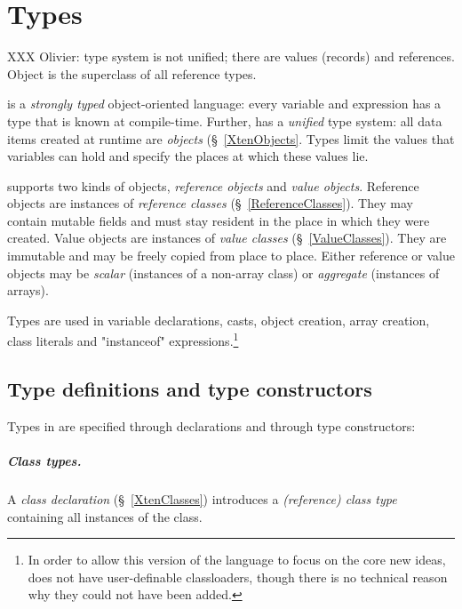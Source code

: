 \chapter{Types}
\label{XtenTypes}

XXX Olivier: type system is not unified; there are values
(records) and references.
Object is the superclass of all reference types.

{}\Xten{} is a {\em strongly typed} object-oriented language: every variable
and expression has a type that is known at compile-time. Further,
\Xten{} has a {\em unified} type system: all data items created at
runtime are {\em objects} (\S~\ref{XtenObjects}. Types limit the
values that variables can hold and specify the places at which these
values lie.

{}\Xten{} supports two kinds of objects, {\em reference objects} and
{\em value objects}.  Reference objects are instances of {\em
reference classes} (\S~\ref{ReferenceClasses}). They may contain
mutable fields and must stay resident in the place in which they were
created. Value objects are instances of {\em value classes}
(\S~\ref{ValueClasses}). They are immutable and may be freely copied
from place to place. Either reference or value objects may be 
{\em scalar} (instances of a non-array class) or {\em aggregate} (instances
of arrays).

Types are used in variable declarations, casts, object creation, array
creation, class literals and \xcd"instanceof" expressions.\footnote{In
order to allow this version of the language to focus on the core new
ideas, \XtenCurrVer{} does not have user-definable classloaders,
though there is no technical reason why they could not have been
added.}

\section{Type definitions and type constructors}

Types in \Xten{} are specified through declarations and through
type constructors:

\paragraph{Class types.}
\label{ReferenceTypes}

        A {\em class declaration} (\S~\ref{XtenClasses})
        introduces a 
        {\em (reference) class type}
        containing all instances of the class.

